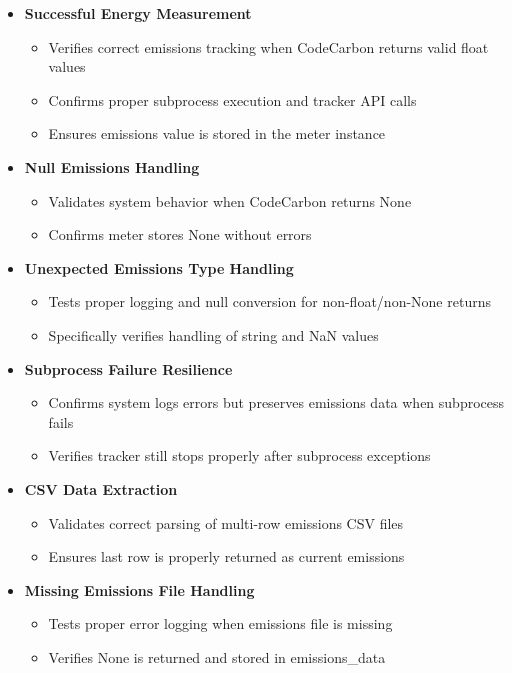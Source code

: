 \documentclass[12pt, titlepage]{article}
\begin{document}
\begin{itemize}
  \item \textbf{Successful Energy Measurement}
    \begin{itemize}
      \item Verifies correct emissions tracking when CodeCarbon returns valid float values
      \item Confirms proper subprocess execution and tracker API calls
      \item Ensures emissions value is stored in the meter instance
    \end{itemize}

  \item \textbf{Null Emissions Handling}
    \begin{itemize}
      \item Validates system behavior when CodeCarbon returns None
      \item Confirms meter stores None without errors
    \end{itemize}

  \item \textbf{Unexpected Emissions Type Handling}
    \begin{itemize}
      \item Tests proper logging and null conversion for non-float/non-None returns
      \item Specifically verifies handling of string and NaN values
    \end{itemize}

  \item \textbf{Subprocess Failure Resilience}
    \begin{itemize}
      \item Confirms system logs errors but preserves emissions data when subprocess fails
      \item Verifies tracker still stops properly after subprocess exceptions
    \end{itemize}

  \item \textbf{CSV Data Extraction}
    \begin{itemize}
      \item Validates correct parsing of multi-row emissions CSV files
      \item Ensures last row is properly returned as current emissions
    \end{itemize}

  \item \textbf{Missing Emissions File Handling}
    \begin{itemize}
      \item Tests proper error logging when emissions file is missing
      \item Verifies None is returned and stored in emissions\_data
    \end{itemize}
\end{itemize}
\end{document}
